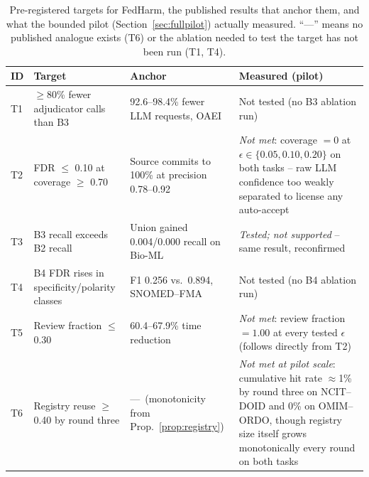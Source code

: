 \documentclass[conference]{IEEEtran}
\begin{document}
\begin{table}[t]
\caption{Pre-registered targets for FedHarm, the published results that anchor them, and what the bounded pilot (Section~\ref{sec:fullpilot}) actually measured. ``---'' means no published analogue exists (T6) or the ablation needed to test the target has not been run (T1, T4).}
\label{tab:targets}
\centering
\footnotesize
\begin{tabular}{@{}p{0.6cm}p{1.85cm}p{2.55cm}p{2.6cm}@{}}
\toprule
\textbf{ID} & \textbf{Target} & \textbf{Anchor} & \textbf{Measured (pilot)} \\
\midrule
T1 & $\ge$80\% fewer adjudicator calls than B3 & 92.6--98.4\% fewer LLM requests, OAEI~\cite{b54} & Not tested (no B3 ablation run) \\
T2 & FDR $\le$ 0.10 at coverage $\ge$ 0.70 & Source commits to 100\% at precision 0.78--0.92~\cite{b1} & \emph{Not met}: coverage $=0$ at $\epsilon\in\{0.05,0.10,0.20\}$ on both tasks -- raw LLM confidence too weakly separated to license any auto-accept \\
T3 & B3 recall exceeds B2 recall & Union gained 0.004/0.000 recall on Bio-ML~\cite{b1} & \emph{Tested; not supported} -- same result, reconfirmed \\
T4 & B4 FDR rises in specificity/polarity classes & F1 0.256 vs.\ 0.894, SNOMED--FMA~\cite{b56,b54} & Not tested (no B4 ablation run) \\
T5 & Review fraction $\le$ 0.30 & 60.4--67.9\% time reduction~\cite{b40} & \emph{Not met}: review fraction $=1.00$ at every tested $\epsilon$ (follows directly from T2) \\
T6 & Registry reuse $\ge$ 0.40 by round three & ---\ (monotonicity from Prop.~\ref{prop:registry}) & \emph{Not met at pilot scale}: cumulative hit rate $\approx$1\% by round three on NCIT--DOID and 0\% on OMIM--ORDO, though registry size itself grows monotonically every round on both tasks \\
\bottomrule
\end{tabular}
\end{table}
\end{document}
